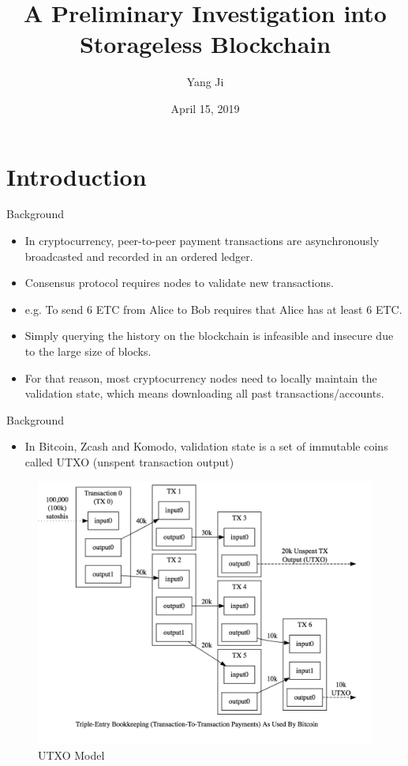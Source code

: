 \documentclass[biblatex,aspectratio=169,11pt]{mybeamer}
\title{A Preliminary Investigation into Storageless Blockchain}
\author{Yang Ji}
\date{April 15, 2019}
\begin{document}
\maketitle%
\PrintTOC%

\section{Introduction}

\begin{frame}{Background}
  \begin{itemize}
    \item In cryptocurrency, peer-to-peer payment transactions are asynchronously broadcasted and recorded in an ordered ledger.
    \item Consensus protocol requires nodes to validate new transactions. 
    \item e.g. To send 6 ETC from Alice to Bob requires that Alice has at least 6 ETC.
    \item Simply querying the history on the blockchain is infeasible and insecure due to the large size of blocks.
    \item For that reason, most cryptocurrency nodes need to locally maintain the \alert{validation state}, which means downloading all past transactions/accounts.
  \end{itemize}
\end{frame}

\begin{frame}{Background}
  \begin{itemize}
    \item In Bitcoin, Zcash and Komodo, \alert{validation state} is a set of immutable coins called \alert{UTXO} (unspent transaction output)
  \end{itemize}
  \vspace{-1em}
  \begin{figure}
    \includegraphics[width=0.45\linewidth]{figs/utxo.png}
    \caption{UTXO Model}
  \end{figure}
\end{frame}
\end{document}
